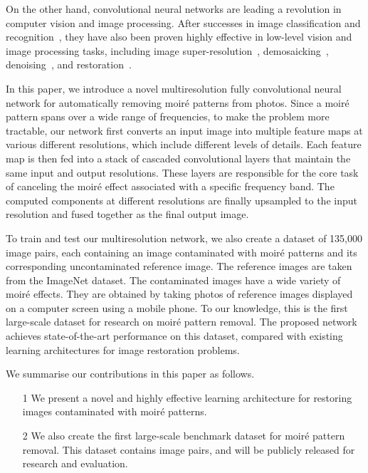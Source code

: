 \documentclass[journal]{IEEEtran}
\begin{document}
On the other hand, convolutional neural networks are leading a revolution in computer vision and image processing.
After successes in image classification and recognition~\cite{simonyan2014very,szegedy2015going}, they have also been proven highly effective in low-level vision and image processing tasks, including image super-resolution~\cite{dong2014learning,kim2016accurate}, demosaicking~\cite{demosaick2016deep}, denoising~\cite{zhang2017beyond}, and restoration~\cite{zhang2017learning}.


In this paper, we introduce a novel multiresolution fully convolutional neural network for automatically removing moir\'{e} patterns from photos. Since a moir\'{e} pattern spans over a wide range of frequencies, to make the problem more tractable, our network first converts an input image into multiple feature maps at various different resolutions, which include different levels of details. Each feature map is then fed into a stack of cascaded convolutional layers that maintain the same input and output resolutions. These layers are responsible for the core task of canceling the moir\'{e} effect associated with a specific frequency band. The computed components at different resolutions are finally upsampled to the input resolution and fused together as the final output image.

To train and test our multiresolution network, we also create a dataset of 135,000 image pairs, each containing an image contaminated with moir\'{e} patterns and its corresponding uncontaminated reference image. The reference images are taken from the ImageNet dataset. The contaminated images have a wide variety of moir\'{e} effects. They are obtained by taking photos of reference images displayed on a computer screen using a mobile phone. To our knowledge, this is the first large-scale dataset for research on moir\'{e} pattern removal. The proposed network achieves state-of-the-art performance on this dataset, compared with existing learning architectures for image restoration problems.

We summarise our contributions in this paper as follows.
\begin{itemize}
\item[1] We present a novel and highly effective learning architecture for restoring images contaminated with moir\'{e} patterns.
\item[2] We also create the first large-scale benchmark dataset for moir\'{e} pattern removal. This dataset contains  image pairs, and will be publicly released for research and evaluation.
\end{itemize}
\end{document}
